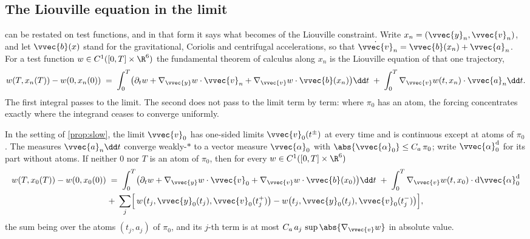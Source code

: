 \subsection{The Liouville equation in the limit}\label{sec:time-liouville}

 can be restated on test functions, and in that form it
says what becomes of the Liouville constraint. Write
$x_n = (\vvec{y}_n,\vvec{v}_n)$, and let $\vvec{b}(x)$ stand for the
gravitational, Coriolis and centrifugal accelerations, so that
$\dot{\vvec{v}}_n = \vvec{b}(x_n) + \vvec{a}_n$. For a test function
$w\in C^1([0,T]\times\R^6)$ the fundamental theorem of calculus along $x_n$
is the Liouville equation of that one trajectory,
\[
  w(T,x_n(T)) - w(0,x_n(0))
  \;=\; \int_0^T \bigl(\partial_t w + \nabla_{\vvec{y}}w\cdot\vvec{v}_n
        + \nabla_{\vvec{v}}w\cdot\vvec{b}(x_n)\bigr)\dd t
  \;+\; \int_0^T \nabla_{\vvec{v}}w(t,x_n)\cdot\vvec{a}_n\dd t .
\]
The first integral passes to the limit. The second does not pass to the
limit term by term: where $\pi_0$ has an atom, the forcing concentrates
exactly where the integrand ceases to converge uniformly.

\begin{prop}\label{prop:liouville}
In the setting of \cref{prop:slow}, the limit $\vvec{v}_0$ has one-sided
limits $\vvec{v}_0(t^\pm)$ at every time and is continuous except at atoms
of $\pi_0$. The measures $\vvec{a}_n\dd t$ converge weakly-$*$ to a vector
measure $\vvec{\alpha}_0$ with $\abs{\vvec{\alpha}_0}\le C_a\,\pi_0$; write
$\vvec{\alpha}_0^{\mathrm{d}}$ for its part without atoms. If neither $0$
nor $T$ is an atom of $\pi_0$, then for every $w\in C^1([0,T]\times\R^6)$
\begin{multline}\label{eq:liouville-limit}
  w(T,x_0(T)) - w(0,x_0(0))
  \;=\; \int_0^T \bigl(\partial_t w + \nabla_{\vvec{y}}w\cdot\vvec{v}_0
        + \nabla_{\vvec{v}}w\cdot\vvec{b}(x_0)\bigr)\dd t
  \;+\; \int_0^T \nabla_{\vvec{v}}w(t,x_0)\cdot
        \mathrm{d}\vvec{\alpha}_0^{\mathrm{d}} \\
  +\; \sum_j \Bigl[\,w\bigl(t_j,\vvec{y}_0(t_j),\vvec{v}_0(t_j^+)\bigr)
             - w\bigl(t_j,\vvec{y}_0(t_j),\vvec{v}_0(t_j^-)\bigr)\Bigr] ,
\end{multline}
the sum being over the atoms $(t_j,a_j)$ of $\pi_0$, and its $j$-th term is
at most $C_a\,a_j\,\sup\abs{\nabla_{\vvec{v}}w}$ in absolute value.
\end{prop}

